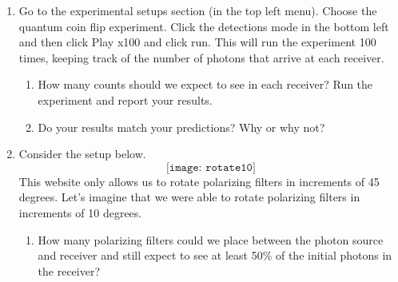 \documentclass[12pt]{article}
\begin{document}
\begin{enumerate}[font=\bfseries]
    \item Go to the experimental setups section (in the top left menu). Choose the quantum coin flip experiment. Click the detections mode in the bottom left and then click Play x100 and click run. This will run the experiment 100 times, keeping track of the number of photons that arrive at each receiver. 
    \begin{enumerate}
        \item How many counts should we expect to see in each receiver? Run the experiment and report your results.
        \item Do your results match your predictions? Why or why not?
    \end{enumerate}
    \item Consider the setup below.
    \[\texttt{[image: rotate10]}\]
    This website only allows us to rotate polarizing filters in increments of 45 degrees. Let's imagine that we were able to rotate polarizing filters in increments of 10 degrees.
    \begin{enumerate}
        \item How many polarizing filters could we place between the photon source and receiver and still expect to see at least 50\% of the initial photons in the receiver?
    \end{enumerate}
\end{enumerate}
\end{document}
